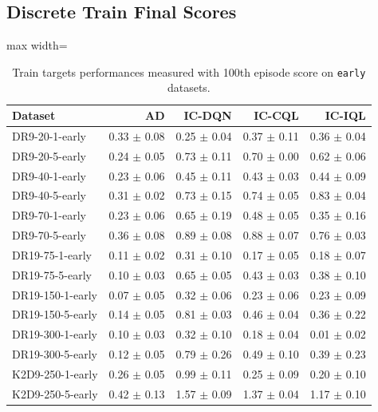 \documentclass{article}
\begin{document}
\subsection{Discrete Train Final Scores}
\begin{table}[ht]
    \label{tab:}
    \begin{center}
    \caption{Train targets performances measured with 100th episode score on \texttt{early} datasets.}
    \begin{small}
    \begin{adjustbox}{max width=\columnwidth}
		\begin{tabular}{l|rrrr}
		\toprule
	\textbf{Dataset} & \textbf{AD} & \textbf{IC-DQN} & \textbf{IC-CQL} & \textbf{IC-IQL}\\
\midrule
DR9-20-1-early & 0.33 $\pm$ 0.08 & 0.25 $\pm$ 0.04 & 0.37 $\pm$ 0.11 & 0.36 $\pm$ 0.04\\
DR9-20-5-early & 0.24 $\pm$ 0.05 & 0.73 $\pm$ 0.11 & 0.70 $\pm$ 0.00 & 0.62 $\pm$ 0.06\\
DR9-40-1-early & 0.23 $\pm$ 0.06 & 0.45 $\pm$ 0.11 & 0.43 $\pm$ 0.03 & 0.44 $\pm$ 0.09\\
DR9-40-5-early & 0.31 $\pm$ 0.02 & 0.73 $\pm$ 0.15 & 0.74 $\pm$ 0.05 & 0.83 $\pm$ 0.04\\
DR9-70-1-early & 0.23 $\pm$ 0.06 & 0.65 $\pm$ 0.19 & 0.48 $\pm$ 0.05 & 0.35 $\pm$ 0.16\\
DR9-70-5-early & 0.36 $\pm$ 0.08 & 0.89 $\pm$ 0.08 & 0.88 $\pm$ 0.07 & 0.76 $\pm$ 0.03\\
DR19-75-1-early & 0.11 $\pm$ 0.02 & 0.31 $\pm$ 0.10 & 0.17 $\pm$ 0.05 & 0.18 $\pm$ 0.07\\
DR19-75-5-early & 0.10 $\pm$ 0.03 & 0.65 $\pm$ 0.05 & 0.43 $\pm$ 0.03 & 0.38 $\pm$ 0.10\\
DR19-150-1-early & 0.07 $\pm$ 0.05 & 0.32 $\pm$ 0.06 & 0.23 $\pm$ 0.06 & 0.23 $\pm$ 0.09\\
DR19-150-5-early & 0.14 $\pm$ 0.05 & 0.81 $\pm$ 0.03 & 0.46 $\pm$ 0.04 & 0.36 $\pm$ 0.22\\
DR19-300-1-early & 0.10 $\pm$ 0.03 & 0.32 $\pm$ 0.10 & 0.18 $\pm$ 0.04 & 0.01 $\pm$ 0.02\\
DR19-300-5-early & 0.12 $\pm$ 0.05 & 0.79 $\pm$ 0.26 & 0.49 $\pm$ 0.10 & 0.39 $\pm$ 0.23\\
K2D9-250-1-early & 0.26 $\pm$ 0.05 & 0.99 $\pm$ 0.11 & 0.25 $\pm$ 0.09 & 0.20 $\pm$ 0.10\\
K2D9-250-5-early & 0.42 $\pm$ 0.13 & 1.57 $\pm$ 0.09 & 1.37 $\pm$ 0.04 & 1.17 $\pm$ 0.10\\

\end{tabular}
\end{adjustbox}
\end{small}
\end{center}
\end{table}
\end{document}
